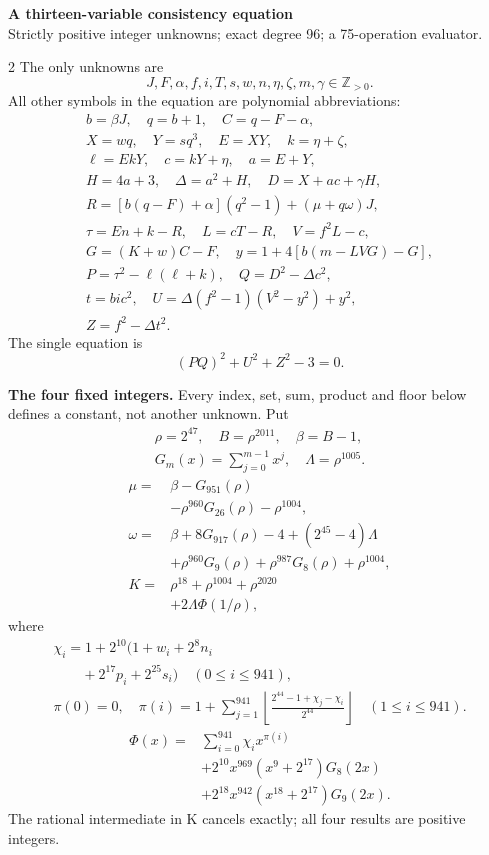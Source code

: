 \documentclass[10pt]{article}
\newcommand{\fl}[1]{\left\lfloor#1\right\rfloor}
\begin{document}
\begin{center}
{\large\bfseries A thirteen-variable consistency equation}\\[-1pt]
{\small Strictly positive integer unknowns; exact degree 96; a 75-operation evaluator.}
\end{center}\vspace{-8pt}
\begin{multicols}{2}
\fontsize{9}{9.5}\selectfont
The only unknowns are
\[
J,F,\alpha,f,i,T,s,w,n,\eta,\zeta,m,\gamma\in\mathbb Z_{>0}.
\]
All other symbols in the equation are polynomial abbreviations:
\[
\begin{gathered}
b=\beta J,\quad q=b+1,\quad C=q-F-\alpha,\\
X=wq,\quad Y=sq^3,\quad E=XY,\quad k=\eta+\zeta,\\
\ell=EkY,\quad c=kY+\eta,\quad a=E+Y,\\
H=4a+3,\quad\Delta=a^2+H,\quad D=X+ac+\gamma H,\\
R=[b(q-F)+\alpha](q^2-1)+(\mu+q\omega)J,\\
\tau=En+k-R,\quad L=cT-R,\quad V=f^2L-c,\\
G=(K+w)C-F,\quad y=1+4[b(m-LVG)-G],\\
P=\tau^2-\ell(\ell+k),\quad Q=D^2-\Delta c^2,\\
t=bic^2,\quad U=\Delta(f^2-1)(V^2-y^2)+y^2,\\
Z=f^2-\Delta t^2.
\end{gathered}
\]
The single equation is
\[
\boxed{(PQ)^2+U^2+Z^2-3=0.}
\]

\textbf{The four fixed integers.}
Every index, set, sum, product and floor below defines a constant, not
another unknown. Put
\[
\begin{gathered}
\rho=2^{47},\quad B=\rho^{2011},\quad\beta=B-1,\\
G_m(x)=\sum_{j=0}^{m-1}x^j,\quad
\Lambda=\rho^{1005}.
\end{gathered}
\]
\begin{align*}
\mu={}&\beta-G_{951}(\rho)\\
&-\rho^{960}G_{26}(\rho)-\rho^{1004},\\
\omega={}&\beta+8G_{917}(\rho)-4+(2^{45}-4)\Lambda\\
&+\rho^{960}G_9(\rho)+\rho^{987}G_8(\rho)
  +\rho^{1004},\\
K={}&\rho^{18}+\rho^{1004}+\rho^{2020}\\
&+2\Lambda\Phi(1/\rho),
\end{align*}
where
\[
\begin{gathered}
\chi_i=1+2^{10}(1+w_i+2^8n_i\\
\qquad+2^{17}p_i+2^{25}s_i)\quad(0\le i\le941),\\
\pi(0)=0,\quad\pi(i)=1+\sum_{j=1}^{941}
\fl{\frac{2^{44}-1+\chi_j-\chi_i}{2^{44}}}\quad(1\le i\le941).
\end{gathered}
\]
\[
\begin{split}
\Phi(x)={}&\sum_{i=0}^{941}\chi_i x^{\pi(i)}\\
&+2^{10}x^{969}(x^9+2^{17})G_8(2x)\\
&+2^{18}x^{942}(x^{18}+2^{17})G_9(2x).
\end{split}
\]
The rational intermediate in K cancels exactly; all four results are positive integers.


\end{multicols}
\end{document}

